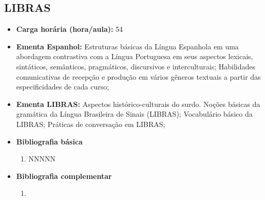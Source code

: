 \documentclass[11pt,fleqn]{book} %
\begin{document}
\subsection{LIBRAS}\label{disc:libras}
\begin{itemize}
	\item \textbf{Carga horária (hora/aula):} 54
	\item \textbf{Ementa Espanhol:} 
	Estruturas básicas da Língua Espanhola em uma abordagem contrastiva com a Língua Portuguesa em seus aspectos lexicais, sintáticos, semânticos, pragmáticos, discursivos e interculturais; 
	Habilidades comunicativas de recepção e produção em vários gêneros textuais a partir das especificidades de cada curso;
	\item \textbf{Ementa LIBRAS:}
	Aspectos histórico-culturais do surdo. Noções básicas da gramática da Língua Brasileira de Sinais (LIBRAS);
	Vocabulário básico da LIBRAS;
	Práticas de conversação em LIBRAS;		
	\item \textbf{Bibliografia básica}
	\begin{enumerate}
		\item NNNNN
	\end{enumerate}
	\item \textbf{Bibliografia complementar}
	\begin{enumerate}
		\item 
	\end{enumerate}	
\end{itemize}

\newpage
\end{document}
